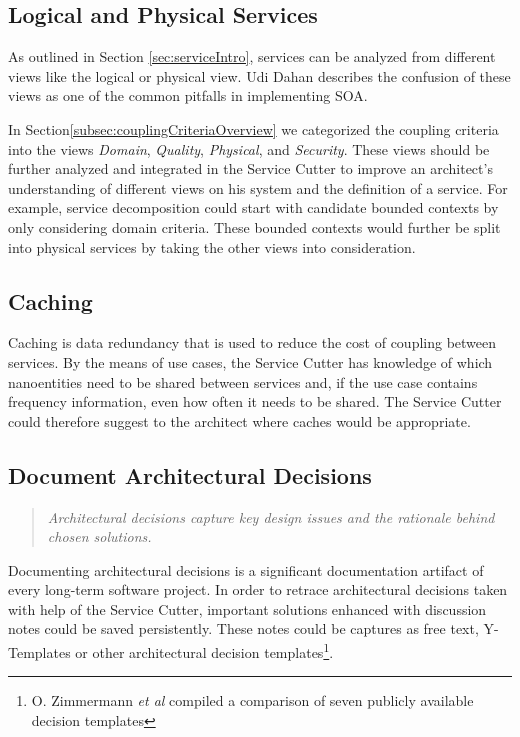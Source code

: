 \subsection{Logical and Physical Services}

As outlined in Section \ref{sec:serviceIntro}, services can be analyzed from different views like the logical or physical view. Udi Dahan describes the confusion of these views as one of the common pitfalls in implementing \gls{SOA}\cite{udiViews}.

In Section\ref{subsec:couplingCriteriaOverview} we categorized the coupling criteria into the views \textit{Domain}, \textit{Quality}, \textit{Physical}, and \textit{Security}. These views should be further analyzed and integrated in the Service Cutter to improve an architect's understanding of different views on his system and the definition of a service. For example, service decomposition could start with candidate bounded contexts by only considering domain criteria. These bounded contexts would further be split into physical services by taking the other views into consideration.

\subsection{Caching}

Caching is data redundancy that is used to reduce the cost of coupling between services. By the means of use cases, the Service Cutter has knowledge of which nanoentities need to be shared between services and, if the use case contains frequency information, even how often it needs to be shared. The Service Cutter could therefore suggest to the architect where caches would be appropriate.

\subsection{Document Architectural Decisions}

\begin{quote}
	\textit{Architectural decisions capture key design issues and the rationale behind chosen solutions.}\cite{zioAD}
\end{quote}

Documenting architectural decisions is a significant documentation artifact of every long-term software project. In order to retrace architectural decisions taken with help of the Service Cutter, important solutions enhanced with discussion notes could be saved persistently. These notes could be captures as free text, Y-Templates\cite{zimmermann2012yTemplate} or other architectural decision templates\footnote{O. Zimmermann \textit{et al} compiled a comparison of seven publicly available decision templates\cite[p. 3]{zimmermann2015architectural}}.

